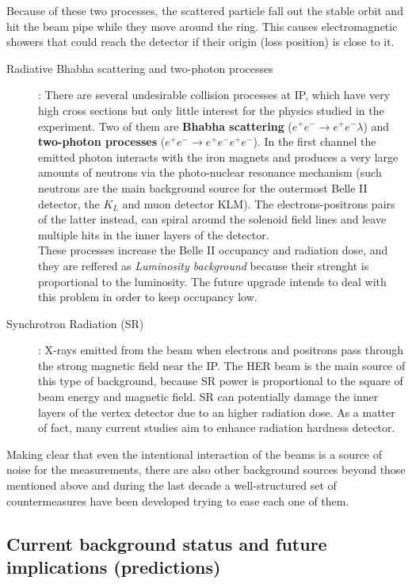 Because of these two processes, the scattered particle fall out the stable orbit and hit the beam pipe while they move around the ring. This causes electromagnetic showers that could reach the detector if their origin (loss position) is close to it.


\begin{description}
\item[Radiative Bhabha scattering and two-photon processes]:
	There are several undesirable collision processes at IP, which have very high cross sections but only little interest for the physics studied in the experiment. Two of them are \textbf{Bhabha scattering} ($e^{+}e^{-} \rightarrow e^{+}e^{-} \lambda$) and \textbf{two-photon processes} ($e^{+}e^{-} \rightarrow e^{+}e^{-}e^{+}e^{-} $). 
	In the first channel the emitted photon interacts with the iron magnets and produces a very large amounts of neutrons via the photo-nuclear resonance mechanism (such neutrons are the main background source for the outermost Belle II detector, the $K_{L}$ and muon detector KLM). The electrons-positrons pairs of the latter instead, can spiral around the solenoid field lines and leave multiple hits in the inner layers of the detector.\\
	
These processes increase the Belle II occupancy and radiation dose, and they are reffered as \textit{Luminosity background} because their strenght is proportional to the luminosity. The future upgrade intends to deal with this problem in order to keep occupancy low.

\item[Synchrotron Radiation (SR)]:
	X-rays emitted from the beam when electrons and positrons pass through the strong magnetic field near the IP. The HER beam is the main source of this type of background, because SR power is proportional to the square of beam energy and magnetic field.
SR can potentially damage the inner layers of the vertex detector due to an higher radiation dose. As a matter of fact, many current studies aim to enhance radiation hardness detector.
\end{description}

Making clear that even the intentional interaction of the beams is a source of noise for the measurements, there are also other background sources beyond those mentioned above and during the last decade a well-structured set of countermeasures have been developed trying to ease each one of them.


\subsection{Current background status and future implications (predictions)}\label{sec:bkg_predictions}

